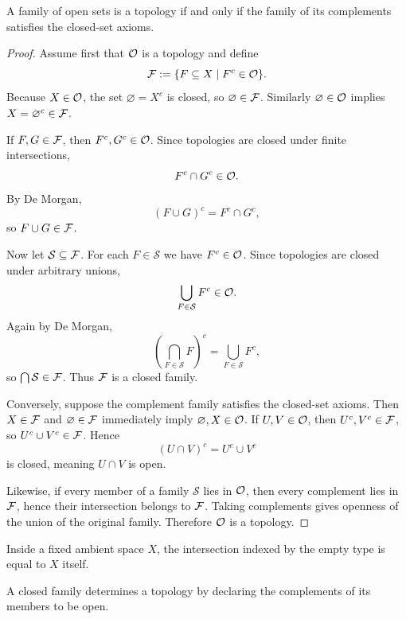 \begin{proposition}\label{prop:closed-open-equivalence}
\leanok
A family of open sets is a topology if and only if the family of its complements satisfies the closed-set axioms.
\begin{proof}
Assume first that $\mathcal{O}$ is a topology and define
\[
\mathcal{F}:=\{F\subseteq X \mid F^c\in\mathcal{O}\}.
\]
Because $X \in \mathcal{O}$, the set $\varnothing = X^c$ is closed, so $\varnothing \in \mathcal{F}$. Similarly $\varnothing \in \mathcal{O}$ implies $X = \varnothing^c \in \mathcal{F}$.

If $F,G \in \mathcal{F}$, then $F^c,G^c \in \mathcal{O}$. Since topologies are closed under finite intersections,
\[
F^c \cap G^c \in \mathcal{O}.
\]
By De Morgan,
\[
(F\cup G)^c = F^c \cap G^c,
\]
so $F\cup G \in \mathcal{F}$.

Now let $\mathcal S \subseteq \mathcal{F}$. For each $F\in\mathcal S$ we have $F^c \in \mathcal{O}$. Since topologies are closed under arbitrary unions,
\[
\bigcup_{F\in\mathcal S} F^c \in \mathcal{O}.
\]
Again by De Morgan,
\[
\left(\bigcap_{F\in\mathcal S}F\right)^c = \bigcup_{F\in\mathcal S}F^c,
\]
so $\bigcap \mathcal S \in \mathcal{F}$. Thus $\mathcal{F}$ is a closed family.

Conversely, suppose the complement family satisfies the closed-set axioms. Then $X \in \mathcal{F}$ and $\varnothing \in \mathcal{F}$ immediately imply $\varnothing, X \in \mathcal{O}$. If $U,V \in \mathcal{O}$, then $U^c,V^c \in \mathcal{F}$, so $U^c \cup V^c \in \mathcal{F}$. Hence
\[
(U\cap V)^c = U^c \cup V^c
\]
is closed, meaning $U\cap V$ is open.

Likewise, if every member of a family $\mathcal S$ lies in $\mathcal{O}$, then every complement lies in $\mathcal{F}$, hence their intersection belongs to $\mathcal{F}$. Taking complements gives openness of the union of the original family. Therefore $\mathcal{O}$ is a topology.
\end{proof}
\end{proposition}

\begin{remark}\label{rem:iinter-empty-1-4}
\leanok
Inside a fixed ambient space $X$, the intersection indexed by the empty type is equal to $X$ itself.
\end{remark}

\begin{remark}\label{rem:closed-to-open-1-5}
\leanok
A closed family determines a topology by declaring the complements of its members to be open.
\end{remark}

